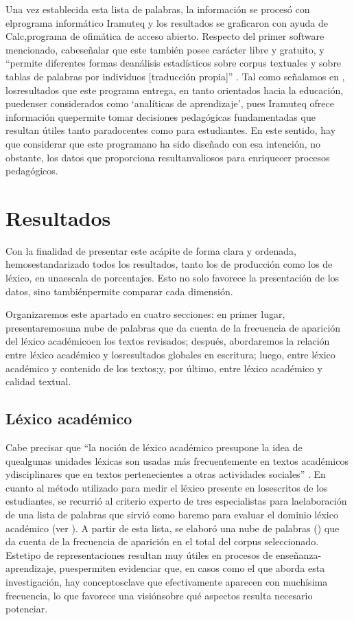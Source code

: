 \documentclass{textolivre}
\begin{document}
Una vez establecida esta lista de palabras, la información se procesó con
elprograma informático Iramuteq y los resultados se graficaron con ayuda de
Calc,programa de ofimática de acceso abierto. Respecto del primer software
mencionado, cabeseñalar que este también posee carácter libre y gratuito, y
“permite diferentes formas deanálisis estadísticos sobre corpus textuales y
sobre tablas de palabras por individuos [traducción propia]” \cite[p. 513]{Camargo2013}.
Tal como señalamos en , losresultados que este programa
entrega, en tanto orientados hacia la educación, puedenser considerados como
‘analíticas de aprendizaje’, pues Iramuteq ofrece información quepermite tomar
decisiones pedagógicas fundamentadas que resultan útiles tanto paradocentes
como para estudiantes. En este sentido, hay que considerar que este programano
ha sido diseñado con esa intención, no obstante, los datos que proporciona
resultanvaliosos para enriquecer procesos pedagógicos.



\section{Resultados}\label{sec-resultados}
Con la finalidad de presentar este acápite de forma clara y ordenada,
hemosestandarizado todos los resultados, tanto los de producción como los de
léxico, en unaescala de porcentajes. Esto no solo favorece la presentación de
los datos, sino tambiénpermite comparar cada dimensión.

Organizaremos este apartado en cuatro secciones: en primer lugar,
presentaremosuna nube de palabras que da cuenta de la frecuencia de aparición
del léxico académicoen los textos revisados; después, abordaremos la relación
entre léxico académico y losresultados globales en escritura; luego, entre
léxico académico y contenido de los textos;y, por último, entre léxico
académico y calidad textual.


\subsection{Léxico académico}\label{sec-lex}
Cabe precisar que “la noción de léxico académico presupone la idea de
quealgunas unidades léxicas son usadas más frecuentemente en textos académicos
ydisciplinares que en textos pertenecientes a otras actividades sociales”
\cite[p. 251]{CisnerosEstupian2019}. En cuanto al método utilizado para medir el
léxico presente en losescritos de los estudiantes, se recurrió al criterio
experto de tres especialistas para laelaboración de una lista de palabras que
sirvió como baremo para evaluar el dominio léxico académico (ver ). A partir
de esta lista, se elaboró una nube de palabras () que da cuenta de la
frecuencia de aparición en el total del corpus seleccionado. Estetipo de
representaciones resultan muy útiles en procesos de enseñanza-aprendizaje,
puespermiten evidenciar que, en casos como el que aborda esta investigación,
hay conceptosclave que efectivamente aparecen con muchísima frecuencia, lo que
favorece una visiónsobre qué aspectos resulta necesario potenciar.
\end{document}
